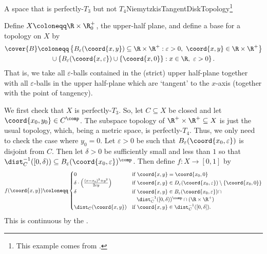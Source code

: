 \begin{exm}{A space that is perfectly-$T_3$ but not $T_4$}{NiemytzkisTangentDiskTopology}\footnote{This example comes from \cite[pg.~100]{Steen}.}
\forwardref

\noindent
Define $X\coloneqq \R \times \R _0^+$, the upper-half plane, and define a base for a topology on $X$ by
\begin{equation}
\begin{split}
\cover{B} & \coloneqq \left\{ B_\varepsilon (\coord{x,y})\subseteq \R \times \R ^+:\varepsilon >0,\ \coord{x,y}\in \R \times \R ^+\right\} \\
& \qquad \cup \left\{ B_\varepsilon (\coord{x,\varepsilon})\cup \{ \coord{x,0}\} :x\in \R ,\ \varepsilon >0\right\} .
\end{split}
\end{equation}
That is, we take all $\varepsilon$-balls contained in the (strict) upper half-plane together with all $\varepsilon$-balls in the upper half-plane which are `tangent' to the $x$-axis (together with the point of tangency).

We first check that $X$ is perfectly-$T_3$.  So, let $C\subseteq X$ be closed and let $\coord{x_0,y_0}\in C^{\comp}$.  The subspace topology of $\R ^+\times \R ^+\subseteq X$ is just the usual topology, which, being a metric space, is perfectly-$T_4$.  Thus, we only need to check the case where $y_0=0$.  Let $\varepsilon >0$ be such that $B_{\varepsilon}(\coord{x_0,\varepsilon})$ is disjoint from $C$.  Then let $\delta >0$ be sufficiently small and less than $1$ so that $\dist _C^{-1}([0,\delta ))\subseteq B_{\varepsilon}(\coord{x_0,\varepsilon})^{\comp}$.  Then define $f\colon X\rightarrow [0,1]$ by
{\small
\begin{equation}
f(\coord{x,y})\coloneqq \begin{cases}0 & \text{if }\coord{x,y}=\coord{x_0,0} \\
\delta \cdot \left( \frac{(x-x_0)^2+y^2}{2\varepsilon y} \right) & \text{if }\coord{x,y}\in D_{\varepsilon}(\coord{x_0,\varepsilon})\setminus \{ \coord{x_0,0}\} \\
\delta & \text{if }\coord{x,y}\in B_{\varepsilon}(\coord{x_0,\varepsilon})\cap \\  & \ \enspace \dist _C^{-1}([0,\delta ))^{\comp}\cap (\R \times \R ^+) \\
\dist _C(\coord{x,y}) & \text{if }\coord{x,y}\in \dist _C^{-1}([0,\delta ]).\end{cases}
\end{equation}
}
This is continuous by the .


\end{exm}
